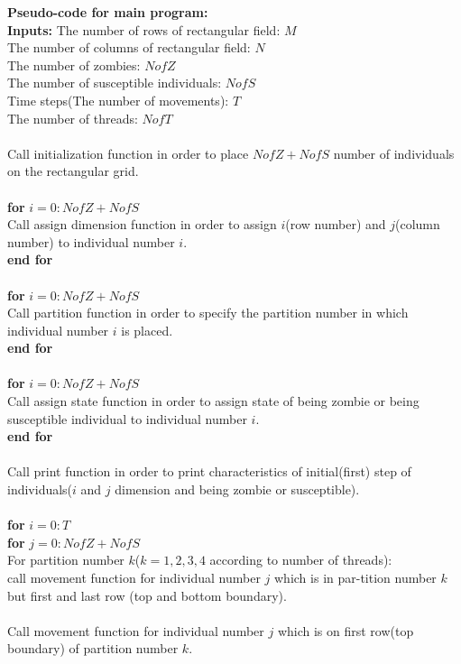 \documentclass[12pt]{article}
\newcommand\tab[1][1cm]{\hspace*{#1}}
\begin{document}
\textbf{Pseudo-code for main program:}\\
\textbf{Inputs:} The number of rows of rectangular field: $M$\\
The number of columns of rectangular field: $N$\\
The number of zombies: $NofZ$\\
The number of susceptible individuals: $NofS$\\
Time steps(The number of movements): $T$\\
The number of threads: $NofT$\\\\
Call initialization function in order to place $NofZ+NofS$ number of individuals on the rectangular grid.\\\\
\textbf{for} $i=0:NofZ+NofS$\\
\tab Call assign dimension function in order to assign $i$(row number) and \tab $j$(column number) to individual number $i$.\\
\textbf{end for}\\\\
\textbf{for} $i=0:NofZ+NofS$\\
\tab Call partition function in order to specify the partition number in which \tab individual number $i$ is placed.\\
\textbf{end for}\\\\
\textbf{for} $i=0:NofZ+NofS$\\
\tab Call assign state function in order to assign state of being zombie or \tab being susceptible individual to individual number $i$.\\
\textbf{end for}\\\\
Call print function in order to print characteristics of initial(first) step of individuals($i$ and $j$ dimension and being zombie or susceptible).\\\\
\textbf{for} $i=0:T$\\
\tab \textbf{for} $j=0:NofZ+NofS$\\
\tab \tab For partition number $k$($k=1,2,3,4$ according to number of \tab \tab threads):\\ \tab \tab call movement function for individual number $j$ which is in par-\tab \tab tition number $k$ but first and last row (top and bottom boundary). \\\\
\tab \tab Call movement function for individual number $j$ which is on first \tab \tab row(top boundary) of partition number $k$. \\\\
\end{document}
